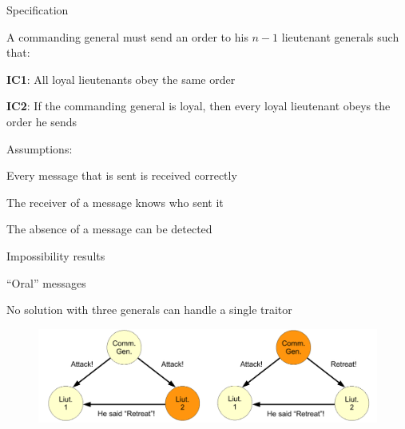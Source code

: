 \begin{frame}{Specification}

\BIL
\item A \alert{commanding general} must send an order to his $n-1$ \alert{lieutenant generals} such that:
\BI
\item \textbf{IC1}: All loyal lieutenants obey the same order
\item \textbf{IC2}: If the commanding general is loyal, then every loyal lieutenant obeys the order he sends
\EI
\item Assumptions:
\BI
\item Every message that is sent is received correctly
\item The receiver of a message knows who sent it
\item The absence of a message can be detected
\EI
\EIL

\end{frame}


\begin{frame}{Impossibility results}
	
\BI
\item “Oral” messages
\item No solution with three generals can handle a single traitor
\EI
	
\begin{figure}
	\includegraphics[width=\textwidth]{figs/16/impossibility}
\end{figure}

\end{frame}


